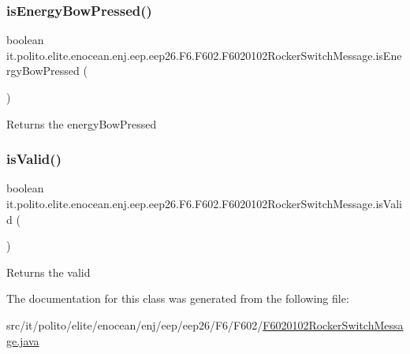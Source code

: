 \subsubsection{\texorpdfstring{is\+Energy\+Bow\+Pressed()}{isEnergyBowPressed()}}
{\footnotesize\ttfamily boolean it.\+polito.\+elite.\+enocean.\+enj.\+eep.\+eep26.\+F6.\+F602.\+F6020102\+Rocker\+Switch\+Message.\+is\+Energy\+Bow\+Pressed (\begin{DoxyParamCaption}{ }\end{DoxyParamCaption})}

\begin{DoxyReturn}{Returns}
the energy\+Bow\+Pressed 
\end{DoxyReturn}
\hypertarget{classit_1_1polito_1_1elite_1_1enocean_1_1enj_1_1eep_1_1eep26_1_1_f6_1_1_f602_1_1_f6020102_rocker_switch_message_a5f3d65339141bd7e6522114f6e91fb81}{}\label{classit_1_1polito_1_1elite_1_1enocean_1_1enj_1_1eep_1_1eep26_1_1_f6_1_1_f602_1_1_f6020102_rocker_switch_message_a5f3d65339141bd7e6522114f6e91fb81} 
\subsubsection{\texorpdfstring{is\+Valid()}{isValid()}}
{\footnotesize\ttfamily boolean it.\+polito.\+elite.\+enocean.\+enj.\+eep.\+eep26.\+F6.\+F602.\+F6020102\+Rocker\+Switch\+Message.\+is\+Valid (\begin{DoxyParamCaption}{ }\end{DoxyParamCaption})}

\begin{DoxyReturn}{Returns}
the valid 
\end{DoxyReturn}


The documentation for this class was generated from the following file\+:\begin{DoxyCompactItemize}
\item 
src/it/polito/elite/enocean/enj/eep/eep26/\+F6/\+F602/\hyperlink{_f6020102_rocker_switch_message_8java}{F6020102\+Rocker\+Switch\+Message.\+java}\end{DoxyCompactItemize}
